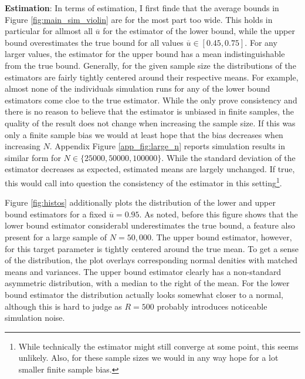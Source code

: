\documentclass{article}
\begin{document}
\textbf{Estimation}: In terms of estimation, I first finde that the average bounds in Figure \ref{fig:main_sim_violin} are for the most part too wide. This holds in particular for allmost all $\overline{u}$ for the estimator of the lower bound, while the upper bound overestimates the true bound for all values $\overline{u}\in[0.45, 0.75]$. For any larger values, the estimator for the upper bound has a mean indistinguishable from the true bound.
Generally, for the given sample size the distributions of the estimators are fairly tightly centered around their respective means. For example, almost none of the individuals simulation runs for any of the lower bound estimators come cloe to the true estimator.
While the \citet{mogstad2018using} only prove consistency and there is no reason to believe that the estimator is unbiased in finite samples, the quality of the result does not change when increasing the sample size. 
If this was only a finite sample bias we would at least hope that the bias decreases when increasing $N$. Appendix Figure \ref{app_fig:large_n} reports simulation results in similar form for $N\in\{25000, 50000, 100000\}$. While the standard deviation of the estimator decreases as expected, estimated means are largely unchanged.
If true, this would call into question the consistency of the estimator in this setting\footnote{While technically the estimator might still converge at some point, this seems unlikely. Also, for these sample sizes we would in any way hope for a lot smaller finite sample bias.}. 

Figure \ref{fig:histos} additionally plots the distribution of the lower and upper bound estimators for a fixed $\overline{u}=0.95$.
As noted, before this figure shows that the lower bound estimator considerabl underestimates the true bound, a feature also present for a large sample of $N=50,000$.
The upper bound estimator, however, for this target parameter is tightly centered around the true mean. 
To get a sense of the distribution, the plot overlays corresponding normal denities with matched means and variances. The upper bound estimator clearly has a non-standard asymmetric distribution, with a median to the right of the mean.
For the lower bound estimator the distribution actually looks somewhat closer to a normal, although this is hard to judge as $R=500$ probably introduces noticeable simulation noise. 
\end{document}
